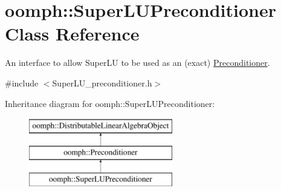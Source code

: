\hypertarget{classoomph_1_1SuperLUPreconditioner}{}\section{oomph\+:\+:Super\+L\+U\+Preconditioner Class Reference}
\label{classoomph_1_1SuperLUPreconditioner}


An interface to allow Super\+LU to be used as an (exact) \hyperlink{classoomph_1_1Preconditioner}{Preconditioner}.  




{\ttfamily \#include $<$Super\+L\+U\+\_\+preconditioner.\+h$>$}

Inheritance diagram for oomph\+:\+:Super\+L\+U\+Preconditioner\+:\begin{figure}[H]
\begin{center}
\leavevmode
\includegraphics[height=3.000000cm]{classoomph_1_1SuperLUPreconditioner}
\end{center}
\end{figure}

